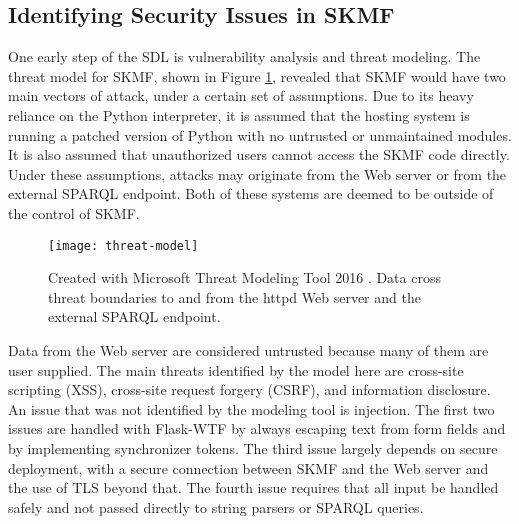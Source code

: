 \subsection{Identifying Security Issues in SKMF}
\label{method:threats}

One early step of the SDL is vulnerability analysis and threat modeling. The threat model for SKMF, shown in Figure
\ref{threat-model},
revealed that SKMF would have two main vectors of attack, under a certain set of assumptions. Due to its heavy reliance on the Python interpreter, it is assumed that the hosting system is running a patched version of Python with no untrusted or unmaintained modules. It is also assumed that unauthorized users cannot access the SKMF code directly. Under these assumptions, attacks may originate from the Web server or from the external SPARQL endpoint. Both of these systems are deemed to be outside of the control of SKMF.

\begin{figure}[p]
\texttt{[image: threat-model]}
\caption[Data flow diagram with threat boundaries]
 {\narrower Created with Microsoft Threat Modeling Tool 2016
  \cite{mstmt}.
  Data cross threat boundaries to and from the httpd Web server and the external SPARQL endpoint.
 }
\label{threat-model}
\end{figure}

Data from the Web server are considered untrusted because many of them are user supplied. The main threats identified by the model here are cross-site scripting (XSS), cross-site request forgery (CSRF), and information disclosure. An issue that was not identified by the modeling tool is injection. The first two issues are handled with Flask-WTF by always escaping text from form fields and by implementing synchronizer tokens. The third issue largely depends on secure deployment, with a secure connection between SKMF and the Web server and the use of TLS beyond that. The fourth issue requires that all input be handled safely and not passed directly to string parsers or SPARQL queries.

